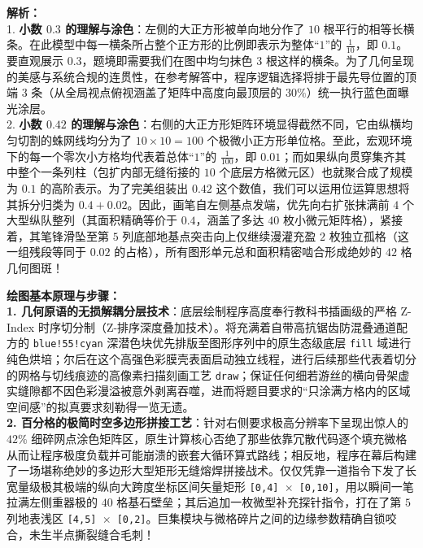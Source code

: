 {\small\color{gray}
\textbf{解析：}\\
1. \textbf{小数 $0.3$ 的理解与涂色}：左侧的大正方形被单向地分作了 $10$ 根平行的相等长横条。在此模型中每一横条所占整个正方形的比例即表示为整体“$1$”的 $\frac{1}{10}$，即 $0.1$。要直观展示 $0.3$，题境即需要我们在图中均匀抹色 $3$ 根这样的横条。为了几何呈现的美感与系统合规的连贯性，在参考解答中，程序逻辑选择将排于最先导位置的顶端 $3$ 条（从全局视点俯视涵盖了矩阵中高度向最顶层的 $30\%$）统一执行蓝色面曝光涂层。\\
2. \textbf{小数 $0.42$ 的理解与涂色}：右侧的大正方形矩阵环境显得截然不同，它由纵横均匀切割的蛛网线均分为了 $10 \times 10 = 100$ 个极微小正方形单位格。至此，宏观环境下的每一个零次小方格均代表着总体“$1$”的 $\frac{1}{100}$，即 $0.01$；而如果纵向贯穿集齐其中整个一条列柱（包扩内部无缝衔接的 $10$ 个底层方格微元区）也就聚合成了规模为 $0.1$ 的高阶表示。为了完美组装出 $0.42$ 这个数值，我们可以运用位运算思想将其拆分归类为 $0.4 + 0.02$。因此，画笔自左侧基点发端，优先向右扩张抹满前 $4$ 个大型纵队整列（其面积精确等价于 $0.4$，涵盖了多达 $40$ 枚小微元矩阵格），紧接着，其笔锋滑坠至第 $5$ 列底部地基点突击向上仅继续漫灌充盈 $2$ 枚独立孤格（这一组残段等同于 $0.02$ 的占格），所有图形单元总和面积精密啮合形成绝妙的 $42$ 格几何图斑！
}

\vspace{0.6cm}

{\small\color{blue!70!black}
\textbf{绘图基本原理与步骤：}\\
\textbf{1. 几何原语的无损解耦分层技术}：底层绘制程序高度奉行教科书插画级的严格 Z-Index 时序切分制（Z-排序深度叠加技术）。将充满着自带高抗锯齿防混叠通道配方的 \texttt{blue!55!cyan} 深潜色块优先排版至图形序列中的原生态级底层 \texttt{fill} 域进行纯色烘培；尔后在这个高强色彩膜壳表面启动独立线程，进行后续那些代表着切分的网格与切线痕迹的高像素扫描刻画工艺 \texttt{draw}；保证任何细若游丝的横向骨架虚实缝隙都不因色彩漫溢被意外剥离吞噬，进而将题目要求的“只涂满方格内的区域空间感”的拟真要求刻勒得一览无遗。\\
\textbf{2. 百分格的极简时空多边形拼接工艺}：针对右侧要求极高分辨率下呈现出惊人的 $42\%$ 细碎网点涂色矩阵区，原生计算核心否绝了那些依靠冗散代码逐个填充微格从而让程序极度负载并可能崩溃的嵌套大循环算式路线；相反地，程序在幕后构建了一场堪称绝妙的多边形大型矩形无缝熔焊拼接战术。仅仅凭靠一道指令下发了长宽量级极其极端的纵向大跨度坐标区间矢量矩形 \texttt{[0,4] $\times$ [0,10]}，用以瞬间一笔拉满左侧重器极的 $40$ 格基石壁垒；其后追加一枚微型补充探针指令，打在了第 $5$ 列地表浅区 \texttt{[4,5] $\times$ [0,2]}。巨集模块与微格碎片之间的边缘参数精确自锁咬合，未生半点撕裂缝合毛刺！
}


